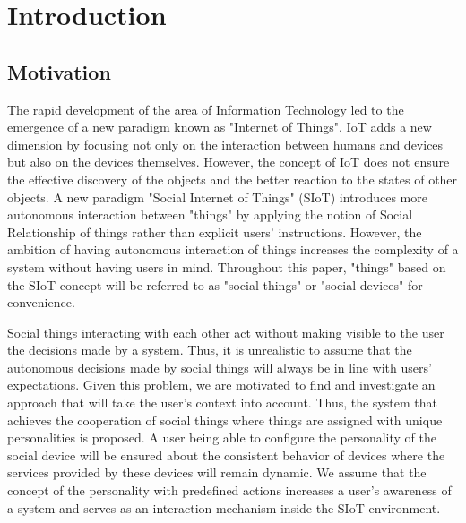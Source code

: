 \chapter{Introduction}
\label{ch:introduction}

\section{Motivation}
\label{sec:motivation}
The rapid development of the area of Information Technology led to the
emergence of a new paradigm known as "Internet of Things".
IoT adds a new dimension by focusing not only on the interaction between
humans and devices but also on the devices themselves.
However, the concept of IoT does not ensure the effective discovery of the
objects and the better reaction to the states of other objects.
A new paradigm "Social Internet of Things" (SIoT) introduces more autonomous
interaction between "things" by applying the notion of Social Relationship of
things rather than explicit users' instructions.
However, the ambition of having autonomous interaction of things increases
the complexity of a system without having users in mind.
Throughout this paper, "things" based on the SIoT concept will be referred to as
"social things" or "social devices" for convenience.

Social things interacting with each other act without making visible to the
user the decisions made by a system.
Thus, it is unrealistic to assume that the autonomous decisions made by
social things will always be in line with users' expectations.
Given this problem, we are motivated to find and investigate an approach
that will take the user's context into account.
Thus, the system that achieves the cooperation of social things
where things are assigned with unique personalities is proposed.
A user being able to configure the personality of the social device will be ensured about
the consistent behavior of devices where the services provided by these devices will remain dynamic.
We assume that the concept of the personality with predefined actions increases a user's
awareness of a system and serves as an interaction mechanism inside the SIoT environment.

